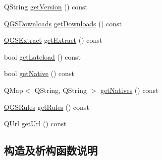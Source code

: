 \begin{DoxyCompactItemize}
\item 
Q\+String \mbox{\hyperlink{class_q_g_s_library_a2f6629e0845ca92af5f7a88353b6d1f3}{get\+Version}} () const
\item 
\mbox{\hyperlink{class_q_g_s_downloads}{Q\+G\+S\+Downloads}} \mbox{\hyperlink{class_q_g_s_library_a6244352fd724a6cfc28e09b6aa054cfe}{get\+Downloads}} () const
\item 
\mbox{\hyperlink{class_q_g_s_extract}{Q\+G\+S\+Extract}} \mbox{\hyperlink{class_q_g_s_library_ac3880d78d76820c6da0668fb711a3097}{get\+Extract}} () const
\item 
bool \mbox{\hyperlink{class_q_g_s_library_a0609b7dde1c1141a1864cd93151ffdca}{get\+Lateload}} () const
\item 
bool \mbox{\hyperlink{class_q_g_s_library_a48416d01abac4e397e0d82dccf43cc9c}{get\+Native}} () const
\item 
Q\+Map$<$ Q\+String, Q\+String $>$ \mbox{\hyperlink{class_q_g_s_library_ab1083f406bcd81a5a979f4f2d722abbd}{get\+Natives}} () const
\item 
\mbox{\hyperlink{class_q_g_s_rules}{Q\+G\+S\+Rules}} \mbox{\hyperlink{class_q_g_s_library_ad72ad2b65c3f42da905f739863d6acbf}{get\+Rules}} () const
\item 
Q\+Url \mbox{\hyperlink{class_q_g_s_library_a0b0836b16d3384c2b1b5cede6915a27b}{get\+Url}} () const
\end{DoxyCompactItemize}


\subsection{构造及析构函数说明}
\mbox{\label{class_q_g_s_library_a75d51341074e016b5be184a26546479d}} 

